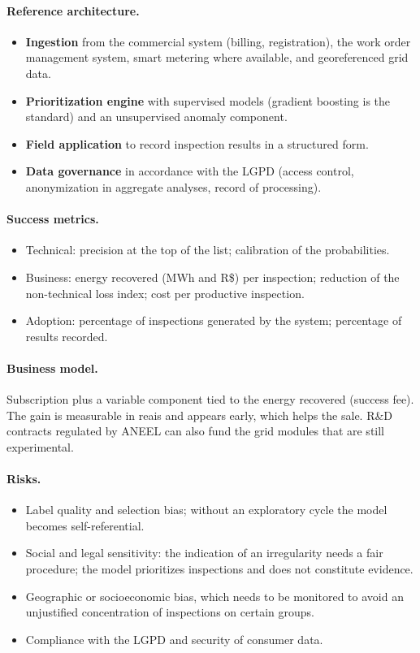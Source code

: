 \documentclass[10pt,a4paper,oneside]{article}
\begin{document}
\paragraph{Reference architecture.}
\begin{itemize}
  \item \textbf{Ingestion} from the commercial system (billing,
    registration), the work order management system, smart metering where
    available, and georeferenced grid data.
  \item \textbf{Prioritization engine} with supervised models (gradient
    boosting is the standard) and an unsupervised anomaly component.
  \item \textbf{Field application} to record inspection results in a
    structured form.
  \item \textbf{Data governance} in accordance with the LGPD (access
    control, anonymization in aggregate analyses, record of processing).
\end{itemize}

\paragraph{Success metrics.}
\begin{itemize}
  \item Technical: precision at the top of the list; calibration of the
    probabilities.
  \item Business: energy recovered (MWh and R\$) per inspection; reduction
    of the non-technical loss index; cost per productive inspection.
  \item Adoption: percentage of inspections generated by the system;
    percentage of results recorded.
\end{itemize}

\paragraph{Business model.}
Subscription plus a variable component tied to the energy recovered (success
fee). The gain is measurable in reais and appears early, which helps the
sale. R\&D contracts regulated by ANEEL can also fund the grid modules that
are still experimental.

\paragraph{Risks.}
\begin{itemize}
  \item Label quality and selection bias; without an exploratory cycle the
    model becomes self-referential.
  \item Social and legal sensitivity: the indication of an irregularity
    needs a fair procedure; the model prioritizes inspections and does not
    constitute evidence.
  \item Geographic or socioeconomic bias, which needs to be monitored to
    avoid an unjustified concentration of inspections on certain groups.
  \item Compliance with the LGPD and security of consumer data.
\end{itemize}
\end{document}
